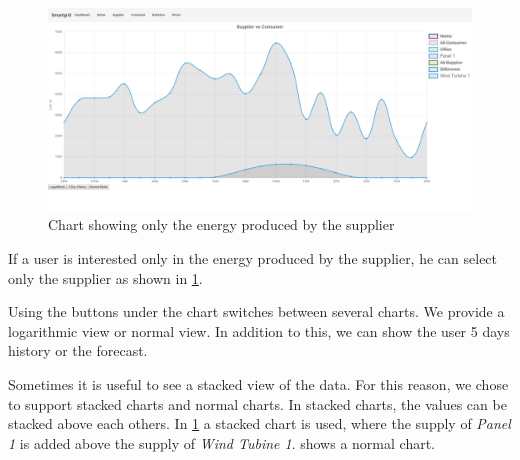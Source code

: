 \begin{figure}[!h]
	\centering
	\includegraphics[width=1.00\textwidth]{../figures/SupplierStacked.png}
	\caption{Chart showing only the energy produced by the supplier}
	\label{fig:supplierChart}
\end{figure}

If a user is interested only in the energy produced by the supplier, he can select only the supplier as shown in \cref{fig:supplierChart}.

Using the buttons under the chart switches between several charts.
We provide a logarithmic view or normal view.
In addition to this, we can show the user 5 days history or the forecast.

Sometimes it is useful to see a stacked view of the data. For this reason, we chose to support stacked charts and normal charts.
In stacked charts, the values can be stacked above each others.
In \cref{fig:supplierChart} a stacked chart is used, where the supply of \textit{Panel 1} is added above the supply of \textit{Wind Tubine 1}.
 shows a normal chart.

